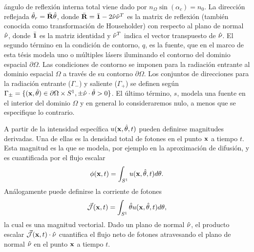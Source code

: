 ángulo de reflexión interna total viene dado por $n_{\Omega} \sin(\alpha_c)=n_0$.
La dirección reflejada $\hat{\theta}_r=\bar{\mathbf{R}} \hat{\theta}$, donde $\bar{\mathbf{R}} =\bar{\mathbf{1}}-2\hat{\nu} \hat{\nu}^T$ es la matrix de reflexión 
(también conocida como transformación de Householder) con respecto al plano de normal $\hat{\nu}$, donde $\bar{\mathbf{1}}$ 
es la matriz identidad y $\hat{\nu}^T$ 
indica el vector transpuesto de $\hat{\nu}$.   El 
segundo término en la condición de contorno, $q$, es la fuente, que en el marco de esta tésis 
modela uno o múltiples lásers iluminando el contorno del dominio espacial $\partial \Omega$. 
Las condiciones de contorno se imponen para la radiación entrante 
al dominio espacial $\Omega$ a través de su contorno $\partial \Omega$. 
Los conjuntos de direcciones para la radiación entrante ($\Gamma_-$) y saliente ($\Gamma_+$) 
se definen según $\Gamma_{\pm}=\{(\mathbf{x},\hat{\theta}) \in \partial \Omega \times S^1, 
\pm \hat \nu \cdot \hat{\theta} >0 \}$. 
El último término, $s$, modela una fuente en el interior 
del dominio $\Omega$ y en general lo consideraremos nulo, a menos 
que se especifique lo contrario. 

A partir de la intensidad específica $u(\mathbf{x},\hat{\theta},t)$ pueden definirse magnitudes derivadas. 
Una de ellas es la densidad total de fotones 
en el punto $\mathbf{x}$ a tiempo $t$. Esta magnitud es la que se modela, por ejemplo
en la aproximación de difusión, y es cuantificada por el flujo escalar
\begin{equation}
  \phi(\mathbf{x},t)=\int_{S^1} u(\mathbf{x},\hat{\theta},t) d\theta.
\label{eq:photondensity}
\end{equation}
Análogamente puede definirse la corriente de fotones 
\begin{equation}
 \vec{ \mathcal{J}}(\mathbf{x},t)=\int_{S^1} \hat{\theta} u(\mathbf{x},\hat{\theta},t) d\theta,
\label{eq:photoncurrent}
\end{equation}
la cual es una magnitud vectorial. Dado un plano de normal $\hat{\nu}$, 
el producto escalar $\vec{ \mathcal{J}}(\mathbf{x},t) \cdot \hat{\nu}$ 
cuantifica el flujo neto de fotones atravesando el plano de normal $ \hat{\nu}$ 
en el punto $\mathbf{x}$ a tiempo $t$.

